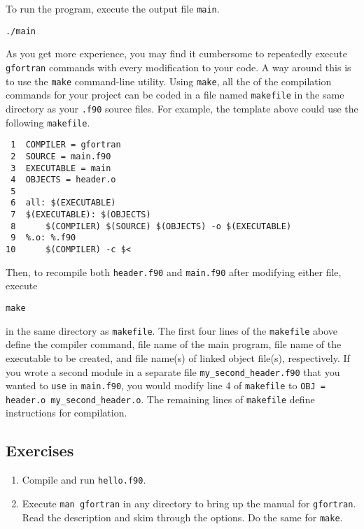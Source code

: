 \documentclass[11pt]{article}
\begin{document}
To run the program, execute the output file \texttt{main}.

\begin{verbatim}
./main
\end{verbatim}

As you get more experience, you may find it cumbersome to repeatedly execute \texttt{gfortran} commands with every modification to your code. A way around this is to use the \texttt{make} command-line utility. Using \texttt{make}, all the of the compilation commands for your project can be coded in a file named \texttt{makefile} in the same directory as your \texttt{.f90} source files. For example, the template above could use the following \texttt{makefile}.

\begin{verbatim}
 1  COMPILER = gfortran
 2  SOURCE = main.f90
 3  EXECUTABLE = main
 4  OBJECTS = header.o
 5  
 6  all: $(EXECUTABLE)
 7  $(EXECUTABLE): $(OBJECTS)
 8      $(COMPILER) $(SOURCE) $(OBJECTS) -o $(EXECUTABLE)
 9  %.o: %.f90
10      $(COMPILER) -c $<
\end{verbatim}

Then, to recompile both \texttt{header.f90} and \texttt{main.f90} after modifying either file, execute

\begin{verbatim}
make
\end{verbatim}

in the same directory as \texttt{makefile}. The first four lines of the \texttt{makefile} above define the compiler command, file name of the main program, file name of the executable to be created, and file name(s) of linked object file(s), respectively. If you wrote a second module in a separate file \texttt{my\_second\_header.f90} that you wanted to \texttt{use} in \texttt{main.f90}, you would modify line 4 of \texttt{makefile} to \texttt{OBJ = header.o my\_second\_header.o}. The remaining lines of \texttt{makefile} define instructions for compilation.

\subsection{Exercises}
\label{sec:orgheadline8}
\begin{enumerate}
\item Compile and run \texttt{hello.f90}.
\item Execute \texttt{man gfortran} in any directory to bring up the manual for \texttt{gfortran}. Read the description and skim through the options. Do the same for \texttt{make}.
\end{enumerate}
\end{document}
